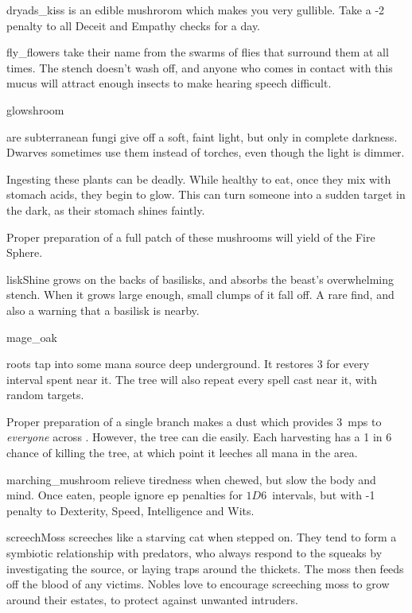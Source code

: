 \begin{multicols}{2}
%
  {dryads_kiss}%
  {is an edible mushrorom which makes you very gullible.
  Take a -2 penalty to all Deceit and Empathy checks for a day.}%

%
  {fly_flowers}%
  {take their name from the swarms of flies that surround them at all times.
  The stench doesn't wash off, and anyone who comes in contact with this mucus will attract enough insects to make hearing speech difficult.}%

%
  {glowshroom}%
  {are subterranean fungi give off a soft, faint light, but only in complete darkness.
   Dwarves sometimes use them instead of torches, even though the light is dimmer.

   Ingesting these plants can be deadly.
   While healthy to eat, once they mix with stomach acids, they begin to glow.
   This can turn someone into a sudden target in the dark, as their stomach shines faintly.

   Proper preparation of a full patch of these mushrooms will yield  of the Fire Sphere.
    }

%
  {liskShine}%
  {grows on the backs of \glspl{basilisk}, and absorbs the beast's overwhelming stench.
  When it grows large enough, small clumps of it fall off.
  A rare find, and also a warning that a basilisk is nearby.
    }

%
  {mage_oak}%
  {roots tap into some mana source deep underground.
    It restores 3  for every \gls{interval} spent near it.
    The tree will also repeat every spell cast near it, with random targets.

    Proper preparation of a single branch makes a dust which provides 3~\glspl{mp} to \emph{everyone} across .
    However, the tree can die easily.
    Each harvesting has a 1 in 6 chance of killing the tree, at which point it leeches all mana in the \gls{area}.
  }%


%
  {marching_mushroom}%
  {relieve tiredness when chewed, but slow the body and mind.
    Once eaten, people ignore \gls{ep} penalties for $1D6$~\glspl{interval}, but with -1 penalty to Dexterity, Speed, Intelligence and Wits.
    }

%
  {screechMoss}%
  {screeches like a starving cat when stepped on.
  They tend to form a symbiotic relationship with predators, who always respond to the squeaks by investigating the source, or laying traps around the thickets.
  The moss then feeds off the blood of any victims.
  Nobles love to encourage screeching moss to grow around their estates, to protect against unwanted intruders.
    }


\end{multicols}
